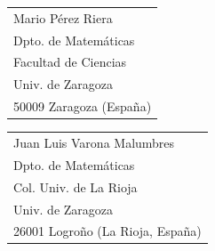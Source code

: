 \documentclass[a4paper]{article}
\begin{document}

\bigskip
\noindent
\begin{tabular}{@{}l}
Mario P\'{e}rez Riera\\
Dpto. de Matem\'{a}ticas\\
Facultad de Ciencias\\
Univ. de Zaragoza\\
50009 Zaragoza (Espa\~{n}a)
\end{tabular}\hfill
\begin{tabular}{l@{}}
Juan Luis Varona Malumbres\\
Dpto. de Matem\'{a}ticas\\
Col. Univ. de La Rioja\\
Univ. de Zaragoza\\
26001 Logro\~{n}o (La Rioja, Espa\~{n}a)
\end{tabular}
\end{document}
